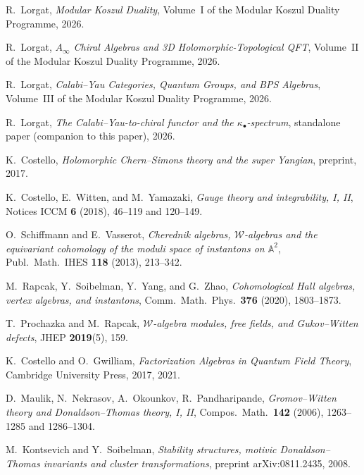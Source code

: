 \documentclass[11pt]{article}
\theoremstyle{plain}
\theoremstyle{definition}
\theoremstyle{remark}
\newcommand{\cW}{\mathcal{W}}
\newcommand{\Ainf}{A_\infty}
\begin{document}
\begin{enumerate}[label={[\arabic*]}]
\item
 R.~Lorgat,
 \emph{Modular Koszul Duality},
 Volume~I of the Modular Koszul Duality Programme, 2026.

\item
 R.~Lorgat,
 \emph{$\Ainf$ Chiral Algebras and 3D Holomorphic-Topological QFT},
 Volume~II of the Modular Koszul Duality Programme, 2026.

\item
 R.~Lorgat,
 \emph{Calabi--Yau Categories, Quantum Groups, and BPS Algebras},
 Volume~III of the Modular Koszul Duality Programme, 2026.

\item
 R.~Lorgat,
 \emph{The Calabi--Yau-to-chiral functor and the
 $\kappa_\bullet$-spectrum},
 standalone paper (companion to this paper), 2026.

\item
 K.~Costello,
 \emph{Holomorphic Chern--Simons theory and the super Yangian},
 preprint, 2017.

\item
 K.~Costello, E.~Witten, and M.~Yamazaki,
 \emph{Gauge theory and integrability, I, II},
 Notices ICCM \textbf{6} (2018), 46--119 and 120--149.

\item
 O.~Schiffmann and E.~Vasserot,
 \emph{Cherednik algebras, $\cW$-algebras and the equivariant
 cohomology of the moduli space of instantons on $\mathbb{A}^2$},
 Publ.\ Math.\ IHES \textbf{118} (2013), 213--342.

\item
 M.~Rapcak, Y.~Soibelman, Y.~Yang, and G.~Zhao,
 \emph{Cohomological Hall algebras, vertex algebras, and
 instantons},
 Comm.\ Math.\ Phys.\ \textbf{376} (2020), 1803--1873.

\item
 T.~Prochazka and M.~Rapcak,
 \emph{$\cW$-algebra modules, free fields, and Gukov--Witten
 defects},
 JHEP \textbf{2019}(5), 159.

\item
 K.~Costello and O.~Gwilliam,
 \emph{Factorization Algebras in Quantum Field Theory},
 Cambridge University Press, 2017, 2021.

\item
 D.~Maulik, N.~Nekrasov, A.~Okounkov, R.~Pandharipande,
 \emph{Gromov--Witten theory and Donaldson--Thomas theory, I, II},
 Compos.\ Math.\ \textbf{142} (2006), 1263--1285 and 1286--1304.

\item
 M.~Kontsevich and Y.~Soibelman,
 \emph{Stability structures, motivic Donaldson--Thomas invariants
 and cluster transformations},
 preprint arXiv:0811.2435, 2008.
\end{enumerate}
\end{document}
